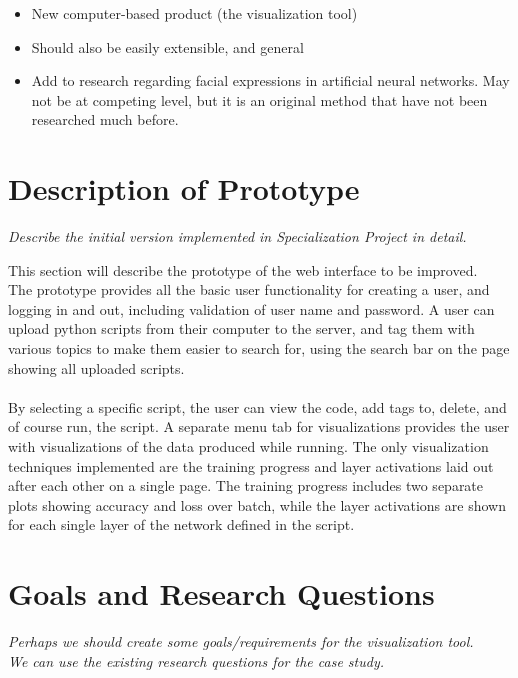 \begin{itemize}
    \item New computer-based product (the visualization tool)
    \item Should also be easily extensible, and general
    \item Add to research regarding facial expressions in artificial neural networks. May not be at competing level, but it is an original method that have not been researched much before.
\end{itemize}

\section{Description of Prototype}

\textit{Describe the initial version implemented in Specialization Project in detail.}

\noindent This section will describe the prototype of the web interface to be improved. \\

\noindent The prototype provides all the basic user functionality for creating a user, and logging in and out, including validation of user name and password. A user can upload python scripts from their computer to the server, and tag them with various topics to make them easier to search for, using the search bar on the page showing all uploaded scripts. \\ \\
\noindent By selecting a specific script, the user can view the code, add tags to, delete, and of course run, the script. A separate menu tab for visualizations provides the user with visualizations of the data produced while running. The only visualization techniques implemented are the training progress and layer activations laid out after each other on a single page. The training progress includes two separate plots showing accuracy and loss over batch, while the layer activations are shown for each single layer of the network defined in the script.

\section{Goals and Research Questions}

\textit{Perhaps we should create some goals/requirements for the visualization tool. \\
We can use the existing research questions for the case study.}

